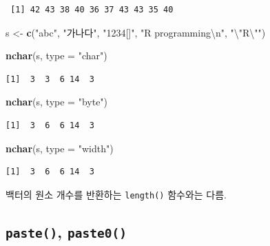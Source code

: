 \documentclass[
  11pt,
]{krantz}
\newenvironment{Shaded}{\begin{snugshade}}{\end{snugshade}}
\newcommand{\CharTok}[1]{\textcolor[rgb]{0.5,0.5,0.5}{#1}}
\newcommand{\DataTypeTok}[1]{\textcolor[rgb]{0.27,0.27,0.27}{#1}}
\newcommand{\KeywordTok}[1]{\textcolor[rgb]{0.27,0.27,0.27}{\textbf{#1}}}
\newcommand{\NormalTok}[1]{#1}
\newcommand{\StringTok}[1]{\textcolor[rgb]{0.5,0.5,0.5}{#1}}
\let\BeginKnitrBlock\begin \let\EndKnitrBlock\end
\begin{document}
\begin{verbatim}
 [1] 42 43 38 40 36 37 43 43 35 40
\end{verbatim}

\begin{Shaded}
\begin{Highlighting}[]
\NormalTok{s <-}\StringTok{ }\KeywordTok{c}\NormalTok{(}\StringTok{"abc"}\NormalTok{, }\StringTok{"가나다"}\NormalTok{, }\StringTok{"1234[]"}\NormalTok{, }\StringTok{"R programming}\CharTok{\textbackslash{}n}\StringTok{"}\NormalTok{, }\StringTok{"}\CharTok{\textbackslash{}"}\StringTok{R}\CharTok{\textbackslash{}"}\StringTok{"}\NormalTok{)}

\KeywordTok{nchar}\NormalTok{(s, }\DataTypeTok{type =} \StringTok{"char"}\NormalTok{)}
\end{Highlighting}
\end{Shaded}

\begin{verbatim}
[1]  3  3  6 14  3
\end{verbatim}

\begin{Shaded}
\begin{Highlighting}[]
\KeywordTok{nchar}\NormalTok{(s, }\DataTypeTok{type =} \StringTok{"byte"}\NormalTok{)}
\end{Highlighting}
\end{Shaded}

\begin{verbatim}
[1]  3  6  6 14  3
\end{verbatim}

\begin{Shaded}
\begin{Highlighting}[]
\KeywordTok{nchar}\NormalTok{(s, }\DataTypeTok{type =} \StringTok{"width"}\NormalTok{)}
\end{Highlighting}
\end{Shaded}

\begin{verbatim}
[1]  3  6  6 14  3
\end{verbatim}

\normalsize

\footnotesize

\BeginKnitrBlock{rmdwarning}
백터의 원소 개수를 반환하는 \texttt{length()} 함수와는 다름.
\EndKnitrBlock{rmdwarning}

\normalsize

\hypertarget{paste}{%
\subsection{\texorpdfstring{\textbf{\texttt{paste()}}, \textbf{\texttt{paste0()}}}{paste(), paste0()}}\label{paste}}
\end{document}
